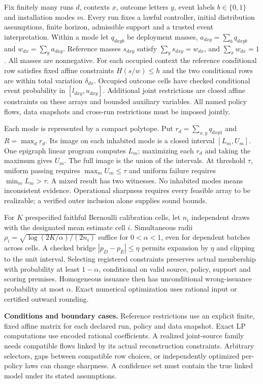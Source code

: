 \begin{theorem}\label{ext:m031}

Fix finitely many runs \(d\), contexts \(x\), outcome letters \(y\), event labels \(b\in\{0,1\}\) and installation modes \(m\). Every run fixes a lawful controller, initial distribution assumptions, finite horizon, admissible support and a trusted event interpretation. Within a mode let \(q_{dxyb}\) be deployment masses, \(a_{dxy}=\sum_bq_{dxyb}\) and \(w_{dx}=\sum_ya_{dxy}\). Reference masses \(s_{dxy}\) satisfy \(\sum_y s_{dxy}=w_{dx}\), and \(\sum_x w_{dx}=1\). All masses are nonnegative. For each occupied context the reference conditional row satisfies fixed affine constraints \(H(s/w)\le h\) and the two conditional rows are within total variation \(\delta_{dx}\). Occupied outcome cells have checked conditional event probability in \([l_{dxy},u_{dxy}]\). Additional joint restrictions are closed affine constraints on these arrays and bounded auxiliary variables. All named policy flows, data snapshots and cross-run restrictions must be imposed jointly.

Each mode is represented by a compact polytope. Put \(r_d=\sum_{x,y}q_{dxy1}\) and \(R=\max_dr_d\). Its image on each inhabited mode is a closed interval \([L_m,U_m]\). One epigraph linear program computes \(L_m\); maximizing each \(r_d\) and taking the maximum gives \(U_m\). The full image is the union of the intervals. At threshold \(\tau\), uniform passing requires \(\max_mU_m\le\tau\) and uniform failure requires \(\min_mL_m>\tau\). A mixed result has two witnesses. No inhabited modes means inconsistent evidence. Operational sharpness requires every feasible array to be realizable; a verified outer inclusion alone supplies sound bounds.

For \(K\) prespecified faithful Bernoulli calibration cells, let \(n_i\) independent draws with the designated mean estimate cell \(i\). Simultaneous radii \(\rho_i=\sqrt{\log(2K/\alpha)/(2n_i)}\) suffice for \(0<\alpha<1\), even for dependent batches across cells. A checked bridge \(|p_D-p_E|\le\eta\) permits expansion by \(\eta\) and clipping to the unit interval. Selecting registered constraints preserves actual membership with probability at least \(1-\alpha\), conditional on valid source, policy, support and scoring premises. Homogeneous issuance then has unconditional wrong-issuance probability at most \(\alpha\). Exact numerical optimization uses rational input or certified outward rounding.

\textbf{Conditions and boundary cases.} Reference restrictions use an explicit finite, fixed affine matrix for each declared run, policy and data snapshot. Exact LP computations use encoded rational coefficients. A realized joint-source family needs compatible flows linked by its actual reconstruction constraints. Arbitrary selectors, gaps between compatible row choices, or independently optimized per-policy laws can change sharpness. A confidence set must contain the true linked model under its stated assumptions.

\end{theorem}

